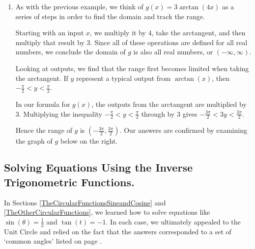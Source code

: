 \documentclass{ximera}
\begin{document}
\begin{example}
\begin{explanation}
\begin{enumerate}
\begin{enumerate}
\begin{center}
\end{center}

\item  As with the previous example, we think of $g(x) = 3\arctan\left(4x \right)$ as a series of steps in order to find the domain and track the range.

 

Starting with an input $x$, we multiply it by $4$, take the arctangent, and then multiply that result by $3$.  Since all of these operations are defined for all real numbers, we conclude the domain of $g$ is also all real numbers, or $(-\infty, \infty)$.  

 

Looking at outputs, we find that the range first becomes limited when taking the arctangent.  If  $y$ represent a typical output from $\arctan(x)$, then $-\frac{\pi}{2} < y < \frac{\pi}{2}$.  

 

In our formula for $g(x)$, the outputs from the arctangent are multiplied by $3$.  Multiplying the inequality $-\frac{\pi}{2} < y < \frac{\pi}{2}$ through by $3$ gives  $-\frac{3\pi}{2} < 3y < \frac{3\pi}{2}$. 

 

Hence the range of $g$ is $\left( -\frac{3\pi}{2}, \frac{3\pi}{2} \right)$.  Our answers are confirmed by examining the graph of $g$ below on the right.

 
\begin{center}
\end{center}

\end{enumerate}

\end{enumerate}

\end{explanation}
\end{example}

\subsection{Solving Equations Using the Inverse Trigonometric Functions.}

In Sections \ref{TheCircularFunctionsSineandCosine} and \ref{TheOtherCircularFunctions}, we learned how to solve equations like $\sin(\theta) = \frac{1}{2}$  and $\tan(t) = -1$. In each case, we ultimately appealed to the Unit Circle and relied on the fact that the answers corresponded to a set of `common angles' listed on page \pageref{commonanglesunitcircle}. 
\end{document}
